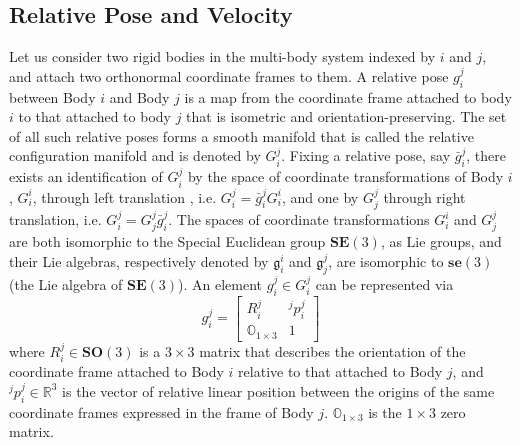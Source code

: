 \documentclass[lettersize,journal]{IEEEtran}
\def \SE {\textbf{SE}(3)}
\def \SO {\textbf{SO}(3)}
\def \se {\textbf{se}(3)}
\def \R  {\mathbb{R}}
\def \g  {\mathfrak{g}}
\theoremstyle{remark}
\begin{document}
\subsection{Relative Pose and Velocity}
\label{rigidbodykinematics}
Let us consider two rigid bodies in the multi-body system indexed by $i$ and $j$, and attach two orthonormal coordinate frames to them. A relative pose $g^j_i$ between Body $i$ and Body $j$ is a map from the coordinate frame attached to body $i$ to that attached to body $j$ that is isometric and orientation-preserving. The set of all such relative poses forms a smooth manifold that is called the relative configuration manifold and is denoted by $G^j_i$.  %
Fixing a relative pose, say $\bar{g}^j_i$, there exists an identification of $G^j_i$ by the space of coordinate transformations of Body $i$, $G^i_i$, through left translation , i.e. $G^j_i={\bar{g}^j_i}G^i_i$, and one by $G^j_j$ through right translation, i.e. $G^j_i=G^j_j{\bar{g}^j_i}$. The spaces of coordinate transformations $G^i_i$ and $G^j_j$ are both isomorphic to the Special Euclidean group $\SE$, as Lie groups, and their Lie algebras, respectively denoted by $\g_i^i$ and $\g_j^j$, are isomorphic to $\se$ (the Lie algebra of $\SE$). %
\label{difkinrigid}
An element $g^j_i\in G^j_i$ can be represented via %
\begin{equation}
    g^j_i=\begin{bmatrix}R^j_i & ^jp^j_i\\\mathbb{O}_{1\times 3} &1\end{bmatrix} 
\end{equation}
where ${R^j_i} \in \SO$ is a ${3 \times 3}$ matrix that describes the orientation of the coordinate frame attached to Body $i$ relative to that attached to Body $j$, and $^jp^j_i \in \R^3$ is the vector of relative linear position between the origins of the same coordinate frames expressed in the frame of Body $j$. $\mathbb{O}_{1\times3}$ is the $1\times 3$ zero matrix.
\end{document}
